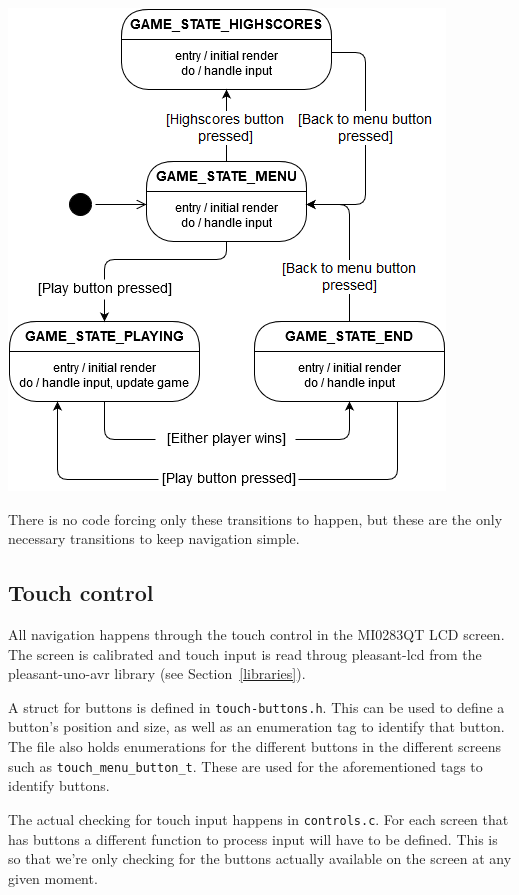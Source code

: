 \includegraphics[scale=0.5]{res/state-diagram.png}

There is no code forcing only these transitions to happen, but these are the
only necessary transitions to keep navigation simple.

\subsection{Touch control}
\label{sec:touch-control}
All navigation happens through the touch control in the MI0283QT LCD screen.
The screen is calibrated and touch input is read throug pleasant-lcd from the
pleasant-uno-avr library (see Section~\ref{libraries}).

A struct for buttons is defined in \texttt{touch-buttons.h}. This can be used
to define a button's position and size, as well as an enumeration tag to
identify that button. The file also holds enumerations for the different
buttons in the different screens such as \texttt{touch\_menu\_button\_t}.
These are used for the aforementioned tags to identify buttons.

The actual checking for touch input happens in \texttt{controls.c}. For each
screen that has buttons a different function to process input will have to
be defined. This is so that we're only checking for the buttons actually
available on the screen at any given moment.
